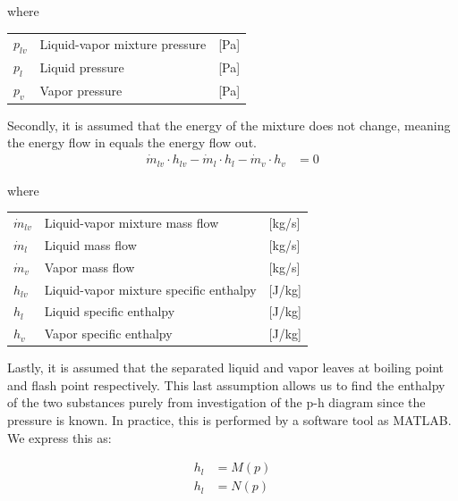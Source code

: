 where

\begin{center}
	\begin{tabular}{l p{8cm} l}
		$p_{lv}$				&  Liquid-vapor mixture pressure		& [\si{Pa}]\\
		$p_{l}$					&  Liquid pressure 						& [\si{Pa}] \\
		$p_{v}$					&  Vapor pressure						& [\si{Pa}]\\

	\end{tabular}
\end{center}


Secondly, it is assumed that the energy of the mixture does not change, meaning the energy flow in equals the energy flow out.
\begin{align}
	\dot{m}_{lv} \cdot  h_{lv}  - \dot{m}_{l} \cdot  h_{l} - \dot{m}_{v} \cdot  h_{v} & = 0
	\label{eq:Flash_tank_energyflow}
\end{align}

where

\begin{center}
	\begin{tabular}{l p{8cm} l}
		$\dot{m}_{lv}$			&  Liquid-vapor mixture mass flow			& [\si{kg}/\si{s}]\\
		$\dot{m}_{l}$			&  Liquid mass flow 						& [\si{kg}/\si{s}] \\
		$\dot{m}_{v}$			&  Vapor mass flow							& [\si{kg}/\si{s}]\\
		$h_{lv}$				&  Liquid-vapor mixture specific enthalpy	& [\si{J}/\si{kg}]\\
		$h_{l}$					&  Liquid specific enthalpy 				& [\si{J}/\si{kg}] \\
		$h_{v}$					&  Vapor specific enthalpy					& [\si{J}/\si{kg}]\\

	\end{tabular}
\end{center}


Lastly, it is assumed that the separated liquid and vapor leaves at boiling point and flash point respectively. This last assumption allows us to find the enthalpy of the two substances purely from investigation of the p-h diagram since the pressure is known. In practice, this is performed by a software tool as MATLAB. We express this as:

\begin{align}
	h_{l}  & = M(p)\\
	h_{l}  & = N(p)\\
\end{align}

